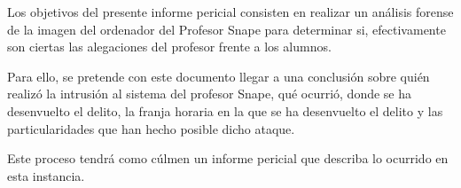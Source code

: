Los objetivos del presente informe pericial consisten en realizar un análisis forense de la imagen del ordenador del Profesor Snape para determinar si, efectivamente son ciertas las alegaciones del profesor frente a los alumnos.

Para ello, se pretende con este documento llegar a una conclusión sobre quién realizó la intrusión al sistema del profesor Snape, qué ocurrió, donde se ha desenvuelto el delito, la franja horaria en la que se ha desenvuelto el delito y las particularidades que han hecho posible dicho ataque.

Este proceso tendrá como cúlmen un informe pericial que describa lo ocurrido en esta instancia.
